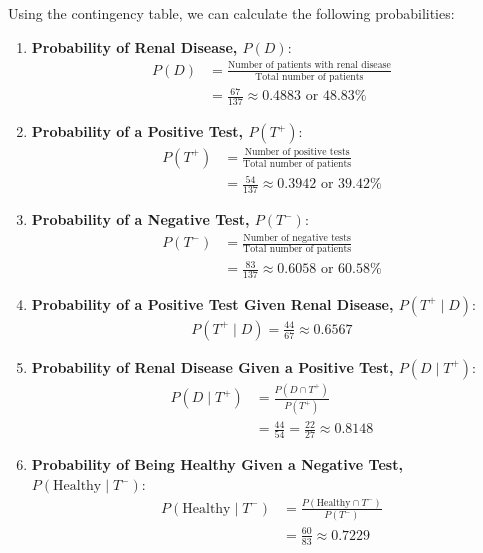 \begin{solution}
    Using the contingency table, we can calculate the following probabilities:

    \begin{enumerate}[label=(\alph*)]
        \item \textbf{Probability of Renal Disease, \( P(D) \)}:
        \begin{align*}
        P(D) &= \frac{\text{Number of patients with renal disease}}{\text{Total number of patients}} \\
        &= \frac{67}{137} \approx 0.4883 \text{ or } 48.83\%
        \end{align*}

        \item \textbf{Probability of a Positive Test, \( P(T^+) \)}:
        \begin{align*}
        P(T^+) &= \frac{\text{Number of positive tests}}{\text{Total number of patients}} \\
        &= \frac{54}{137} \approx 0.3942 \text{ or } 39.42\%
        \end{align*}

        \item \textbf{Probability of a Negative Test, \( P(T^-) \)}:
        \begin{align*}
        P(T^-) &= \frac{\text{Number of negative tests}}{\text{Total number of patients}} \\
        &= \frac{83}{137} \approx 0.6058 \text{ or } 60.58\%
        \end{align*}


        \item \textbf{Probability of a Positive Test Given Renal Disease, \( P(T^+ \mid D) \)}:
        \begin{align*}
            P(T^+ \mid D)=\frac{44}{67} \approx 0.6567
        \end{align*}

        \item \textbf{Probability of Renal Disease Given a Positive Test, \( P(D \mid T^+) \)}:
        \begin{align*}
        P(D \mid T^+) &= \frac{P(D \cap T^+)}{P(T^+)} \\
        &= \frac{44}{54}=\frac{22}{27} \approx 0.8148
        \end{align*}

        \item \textbf{Probability of Being Healthy Given a Negative Test, \( P(\text{Healthy} \mid T^-) \)}:
        \begin{align*}
        P(\text{Healthy} \mid T^-) &= \frac{P(\text{Healthy} \cap T^-)}{P(T^-)} \\
        &= \frac{60}{83} \approx 0.7229
        \end{align*}


\end{enumerate}
\end{solution}
